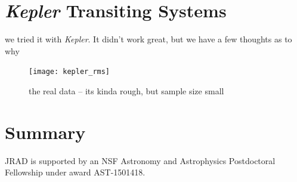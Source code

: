 \documentclass[preprint2]{aastex61}
\newcommand{\Kepler}{\textsl{Kepler}\xspace}
\begin{document}


\section{\Kepler Transiting Systems}
we tried it with \Kepler. It didn't work great, but we have a few thoughts as to why

\begin{figure}[!t]
\centering
\texttt{[image: kepler\_rms]}
\caption{
the real data -- its kinda rough, but sample size small
}
\label{fig:rms}
\end{figure}



\section{Summary}
\label{sec:summary}


\acknowledgments

JRAD is supported by an NSF Astronomy and Astrophysics Postdoctoral Fellowship under award AST-1501418. 



\end{document}
